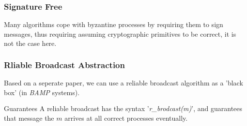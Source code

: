 \begin{frame}
    \frametitle{Signature Free}
    Many algorithms cope with byzantine processes by requiring them to sign messages,
    thus requiring assuming cryptographic primitives to be correct, it is not the case here.
\end{frame}

\begin{frame}
    \frametitle{Rliable Broadcast Abstraction}
    Based on a seperate paper, we can use a reliable broadcast algorithm as a 'black box' (in \emph{BAMP} systems).
    \begin{block}{Guarantees}
        A reliable broadcast has the syntax '\emph{r\_brodcast(m)}', and guarantees
        that message the $m$ arrives at all correct processes eventually.
    \end{block}
\end{frame}

